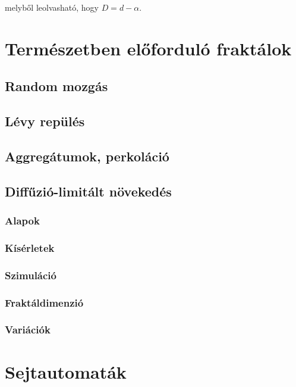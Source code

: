 \documentclass[12pt]{article}
\theoremstyle{plain}
\begin{document}
melyből leolvasható, hogy $D = d- \alpha$. 

\section{Természetben előforduló fraktálok}

\subsection{Random mozgás}

\subsection{Lévy repülés}

\subsection{Aggregátumok, perkoláció}

\subsection{Diffűzió-limitált növekedés}
\subsubsection{Alapok}
\subsubsection{Kísérletek}
\subsubsection{Szimuláció}
\subsubsection{Fraktáldimenzió}
\subsubsection{Variációk}


\section{Sejtautomaták}










\end{document}
